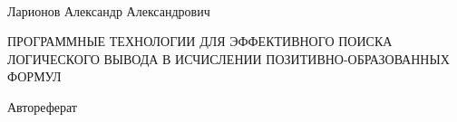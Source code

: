 \documentclass[a4paper]{report}
\begin{document}




\mbox{~}
\vfill{}
\begin{center}

Ларионов Александр Александрович

ПРОГРАММНЫЕ ТЕХНОЛОГИИ ДЛЯ ЭФФЕКТИВНОГО ПОИСКА ЛОГИЧЕСКОГО ВЫВОДА В ИСЧИСЛЕНИИ ПОЗИТИВНО-ОБРАЗОВАННЫХ ФОРМУЛ

Автореферат

\end{center}
\vspace{1cm}{}
\mbox{~}
%
%
%
%
%

%

%
\end{document}
